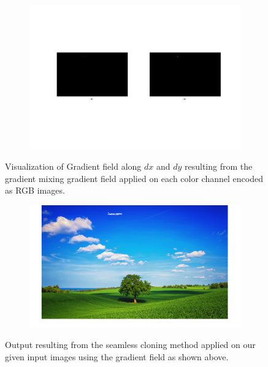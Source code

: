 \documentclass{paper}
\begin{document}
\begin{figure}[H]
    \centering
    \begin{subfigure}{1.0\textwidth}
        \includegraphics[width=\textwidth]{../../outputs/p4/seamless_cloning/plane/gradients}
    \end{subfigure}
    \caption{Visualization of Gradient field along $dx$ and $dy$ resulting from the gradient mixing gradient field applied on each color channel encoded as RGB images.}
    \label{fig:seamless_cloning_plane_gradients}       
\end{figure}


\begin{figure}[H]
    \centering
    \begin{subfigure}{1.0\textwidth}
        \includegraphics[width=\textwidth]{../../outputs/p4/seamless_cloning/plane/output}
    \end{subfigure}
    \caption{Output resulting from the seamless cloning method applied on our given input images using the gradient field as shown above.}
    \label{fig:seamless_cloning_plane_out}       
\end{figure}
\end{document}
